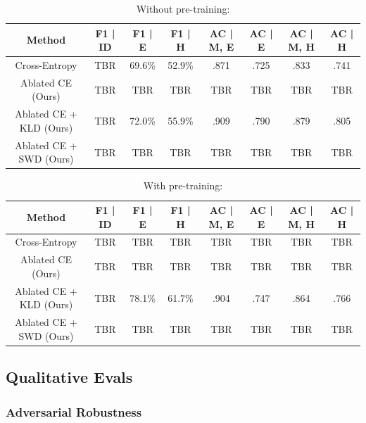 \documentclass{article}
\theoremstyle{plain}
\theoremstyle{definition}
\theoremstyle{remark}
\begin{document}
\begin{table}[h]
	\label{sood-wo-pretrain}
	\caption{Without pre-training:}
	\centering
	\hspace*{-2.5em}
	\begin{tabular}{c|ccccccc}
		\toprule
		\textbf{Method} & \textbf{F1 | ID} & \textbf{F1 | E} & \textbf{F1 | H} & \textbf{AC | M, E} & \textbf{AC | E} & \textbf{AC | M, H} & \textbf{AC | H} \\
		\midrule
		Cross-Entropy 		& TBR & 69.6\% & 52.9\% & .871 & .725 & .833 & .741 \\
		Ablated CE (Ours) 	& TBR & TBR & TBR & TBR & TBR  & TBR & TBR \\
		Ablated CE + KLD (Ours) & TBR & 72.0\% & 55.9\% & .909 & .790  & .879 & .805 \\
		Ablated CE + SWD (Ours) & TBR & TBR & TBR & TBR & TBR  & TBR & TBR \\
		\bottomrule
	\end{tabular}
\end{table}

\begin{table}[h]
	\label{sood-w-pretrain}
	\caption{With pre-training:}
	\centering
	\hspace*{-2.5em}
	\begin{tabular}{c|ccccccc}
		\toprule
		\textbf{Method} & \textbf{F1 | ID} & \textbf{F1 | E} & \textbf{F1 | H} & \textbf{AC | M, E} & \textbf{AC | E} & \textbf{AC | M, H} & \textbf{AC | H} \\
		\midrule
		Cross-Entropy 		& TBR & TBR & TBR & TBR & TBR  & TBR & TBR \\
		Ablated CE (Ours) 	& TBR & TBR & TBR & TBR & TBR  & TBR & TBR \\
		Ablated CE + KLD (Ours) & TBR & 78.1\% & 61.7\% & .904 & .747 & .864 & .766 \\
		Ablated CE + SWD (Ours) & TBR & TBR & TBR & TBR & TBR  & TBR & TBR \\
		\bottomrule
	\end{tabular}
\end{table}

\subsection{Qualitative Evals}

\subsubsection{Adversarial Robustness}
\end{document}
